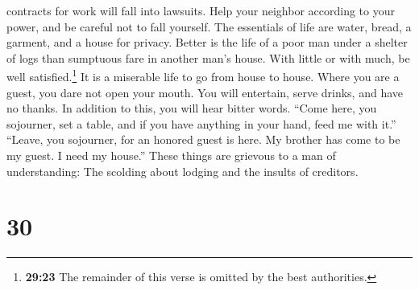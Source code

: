contracts for work will fall into lawsuits.  Help your
neighbor according to your power, and be careful not to fall yourself.
 The essentials of life are water, bread, a garment, and
a house for privacy.  Better is the life of a poor man
under a shelter of logs than sumptuous fare in another man's house.
 With little or with much, be well satisfied.\footnote{\textbf{29:23}
  The remainder of this verse is omitted by the best authorities.}
 It is a miserable life to go from house to house. Where
you are a guest, you dare not open your mouth.  You will
entertain, serve drinks, and have no thanks. In addition to this, you
will hear bitter words.  ``Come here, you sojourner, set
a table, and if you have anything in your hand, feed me with it.''
 ``Leave, you sojourner, for an honored guest is here. My
brother has come to be my guest. I need my house.'' 
These things are grievous to a man of understanding: The scolding about
lodging and the insults of creditors.

\hypertarget{section-25}{%
\section{30}\label{section-25}}


